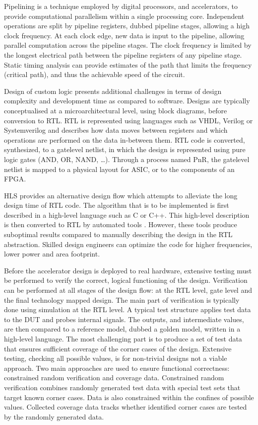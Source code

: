 Pipelining is a technique employed by digital processors, and accelerators, to provide computational parallelism within a single processing core. Independent operations are split by pipeline registers, dubbed pipeline stages, allowing a high clock frequency. At each clock edge, new data is input to the pipeline, allowing parallel computation across the pipeline stages. The clock frequency is limited by the longest electrical path between the pipeline registers of any pipeline stage. Static timing analysis can provide estimates of the path that limits the frequency (critical path), and thus the achievable speed of the circuit.

Design of custom logic presents additional challenges in terms of design complexity and development time as compared to software. Designs are typically conceptualised at a microarchitectural level, using block diagrams, before conversion to \acrfull{RTL}. \acrshort{RTL} is represented using languages such as VHDL, Verilog or Systemverilog and describes how data moves between registers and which operations are performed on the data in-between them. \acrshort{RTL} code is converted, synthesized, to a gatelevel netlist, in which the design is represented using pure logic gates (AND, OR, NAND, \dots). Through a process named \acrfull{PnR}, the gatelevel netlist is mapped to a physical layout for \acrshort{ASIC}, or to the components of an \acrshort{FPGA}.

\acrfull{HLS} provides an alternative design flow which attempts to alleviate the long design time of \acrshort{RTL} code. The algorithm that is to be implemented is first described in a high-level language such as C or C++. This high-level description is then converted to \acrshort{RTL} by automated tools \cite{barriosHardwareImplementationCCSDS2021}. However, these tools produce suboptimal results compared to manually describing the design in the \acrshort{RTL} abstraction. Skilled design engineers can optimize the code for higher frequencies, lower power and area footprint.

Before the accelerator design is deployed to real hardware, extensive testing must be performed to verify the correct, logical functioning of the design. Verification can be performed at all stages of the design flow: at the RTL level, gate level and the final technology mapped design. The main part of verification is typically done using simulation at the \acrshort{RTL} level. A typical test structure applies test data to the \acrfull{DUT} and probes internal signals. The outputs, and intermediate values, are then compared to a reference model, dubbed a golden model, written in a high-level language. The most challenging part is to produce a set of test data that ensures sufficient coverage of the corner cases of the design. Extensive testing, checking all possible values, is for non-trivial designs not a viable approach. Two main approaches are used to ensure functional correctness: constrained random verification and coverage data. Constrained random verification combines randomly generated test data with special test sets that target known corner cases. Data is also constrained within the confines of possible values. Collected coverage data tracks whether identified corner cases are tested by the randomly generated data.

